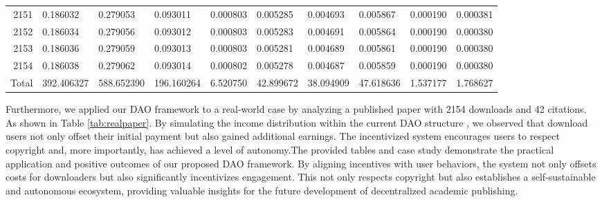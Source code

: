 \documentclass[lettersize,journal]{IEEEtran}
\begin{document}
\begin{table}[t!]
\begin{center}
\begin{tabular}{r|l|l|l|l|l|l|l|l|l}
      2151 & 0.186032 & 0.279053 & 0.093011 & 0.000803 & 0.005285 & 0.004693 & 0.005867 & 0.000190 & 0.000381 \\
      2152 & 0.186034 & 0.279056 & 0.093012 & 0.000803 & 0.005283 & 0.004691 & 0.005864 & 0.000190 & 0.000380 \\
      2153 & 0.186036 & 0.279059 & 0.093013 & 0.000803 & 0.005281 & 0.004689 & 0.005861 & 0.000190 & 0.000380 \\
      2154 & 0.186038 & 0.279062 & 0.093014 & 0.000802 & 0.005278 & 0.004687 & 0.005859 & 0.000190 & 0.000380 \\
      Total & 392.406327 & 588.652390 & 196.160264 & 6.520750 & 42.899672 & 38.094909 & 47.618636 & 1.537177 & 1.768627 \\
      
    \end{tabular}
  \end{center}
\end{table}

Furthermore, we applied our DAO framework to a real-world case by analyzing a published paper with 2154 downloads and 42 citations. As shown in Table \ref{tab:realpaper}. By simulating the income distribution within the current DAO structure \cite{efron1994introduction}, we observed that download users not only offset their initial payment but also gained additional earnings. The incentivized system encourages users to respect copyright and, more importantly, has achieved a level of autonomy.The provided tables and case study demonstrate the practical application and positive outcomes of our proposed DAO framework. By aligning incentives with user behaviors, the system not only offsets costs for downloaders but also significantly incentivizes engagement. This not only respects copyright but also establishes a self-sustainable and autonomous ecosystem, providing valuable insights for the future development of decentralized academic publishing.

\end{document}
